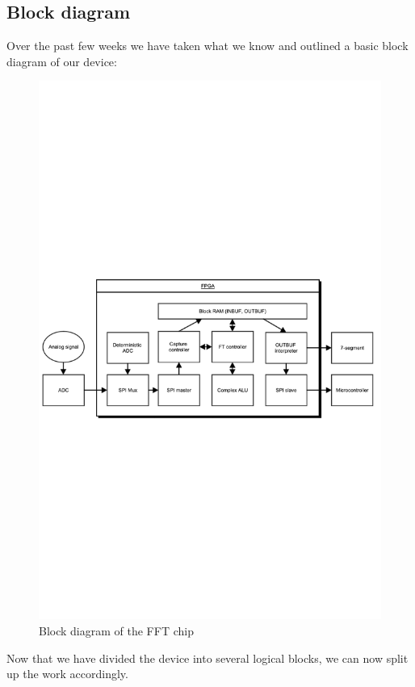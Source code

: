 \documentclass[12pt]{article}
\begin{document}
  \subsection*{Block diagram}
    Over the past few weeks we have taken what we know and outlined a basic block diagram of our device:
    \begin{figure}[H]
      \centering
      \includegraphics[trim=0 400 0 400,clip,width=140mm]{vhdl_fft.pdf}
      \caption{Block diagram of the FFT chip}
      \label{overflow}
    \end{figure}
    Now that we have divided the device into several logical blocks, we can now split up the work accordingly.
\end{document}
